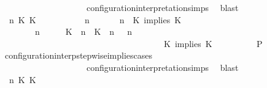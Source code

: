 \begin{isabellebody}
\ \ \ \ \ \ \ \ \ \ \ \ \ \ \ \ \ \ \ \ configuration{\isacharunderscore}interpretation{\isachardot}simps\ \isamarkupfalse%
\ blast\isanewline
\ \ \ \ \isamarkupfalse%
\isanewline
\ \ \ \ \ \ \isamarkupfalse%
\ {\isasymGamma}\ n\ K\ K\ {\isasymPsi}\ {\isasymPhi}\isanewline
\ \ \ \ \ \ \isamarkupfalse%
\ {\isacartoucheopen}{\isacharparenleft}{\isasymGamma}\ n\ {\isasymturnstile}\ {\isasymPsi}\ {\isasymtriangleright}\ {\isasymPhi}\ {\isacharequal}\ {\isacharparenleft}{\isasymGamma}{\isacharcomma}\ n\ {\isasymturnstile}\ {\isacharparenleft}{\isacharparenleft}K\ implies\ K\ {\isacharhash}\ {\isasymPsi}{\isacharparenright}\ {\isasymtriangleright}\ {\isasymPhi}{\isacharparenright}{\isacartoucheclose}\isanewline
\ \ \ \ \ \ \ {\isacartoucheopen}{\isacharparenleft}{\isasymGamma}\ n\ {\isasymturnstile}\ {\isasymPsi}\ {\isasymtriangleright}\ {\isasymPhi}\ {\isacharequal}\ {\isacharparenleft}{\isacharparenleft}{\isacharparenleft}K\ {\isasymUp}\ n{\isacharparenright}\ {\isacharhash}\ {\isacharparenleft}K\ {\isasymUp}\ n{\isacharparenright}\ {\isacharhash}\ {\isasymGamma}{\isacharparenright}{\isacharcomma}\ n\isanewline
\ \ \ \ \ \ \ \ \ \ \ \ \ \ \ \ \ \ \ \ \ \ \ \ \ \ \ \ \ \ \ \ \ \ \ {\isasymturnstile}\ {\isasymPsi}\ {\isasymtriangleright}\ {\isacharparenleft}{\isacharparenleft}K\ implies\ K\ {\isacharhash}\ {\isasymPhi}{\isacharparenright}{\isacharparenright}{\isacartoucheclose}\isanewline
\ \ \ \ \ \ \isamarkupfalse%
\ {\isacharquery}P\ \isamarkupfalse%
\ configuration{\isacharunderscore}interp{\isacharunderscore}stepwise{\isacharunderscore}implies{\isacharunderscore}cases\isanewline
\ \ \ \ \ \ \ \ \ \ \ \ \ \ \ \ \ \ \ \ configuration{\isacharunderscore}interpretation{\isachardot}simps\ \isamarkupfalse%
\ blast\isanewline
\ \ \ \ \isamarkupfalse%
\isanewline
\ \ \ \ \ \ \isamarkupfalse%
\ {\isasymGamma}\ n\ K\ K\ {\isasymPsi}\ {\isasymPhi}\isanewline

\end{isabellebody}
